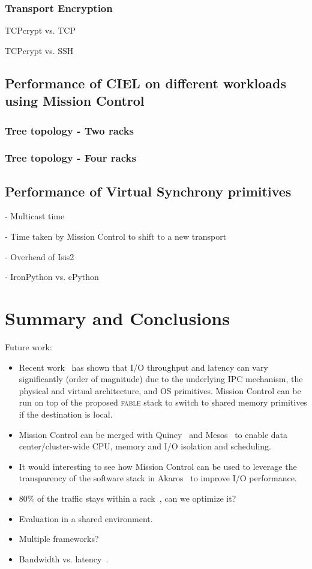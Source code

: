 \documentclass[a4paper,12pt,twoside,openright]{report}
\begin{document}
\subsection{Transport Encryption}
TCPcrypt vs. TCP

TCPcrypt vs. SSH

\section{Performance of CIEL on different workloads using Mission Control}

\subsection{Tree topology - Two racks}
\subsection{Tree topology - Four racks}

\section{Performance of Virtual Synchrony primitives}
- Multicast time

- Time taken by Mission Control to shift to a new transport

- Overhead of Isis2

- IronPython vs. cPython

\chapter{Summary and Conclusions}\label{chapter:conclusion}

Future work:

\begin{itemize}
  \item Recent work~\cite{Smith:2012:TCF} has shown that I/O throughput
	and latency can vary significantly (order of magnitude) due to the underlying
	IPC mechanism, the physical and virtual architecture, and OS primitives.
	Mission Control can be run on top of the proposed \textsc{fable} stack to
	switch to shared memory primitives if the destination is local.
   \item Mission Control can be merged with Quincy~\cite{Isard:2009:QFS} and
   Mesos~\cite{Hindman:2011:MPF} to enable data center/cluster-wide CPU, memory
   and I/O isolation and scheduling.
   \item It would interesting to see how Mission Control can be used to leverage
   the transparency of the software stack in Akaros~\cite{Rhoden:2011:IPE} to
   improve I/O performance.
   \item 80\% of the traffic stays within a rack~\cite{Benson:2010:NTC}, can we
optimize it?
	\item Evaluation in a shared environment.
	\item Multiple frameworks?
	\item Bandwidth vs. latency~\cite{Alizadeh:2012:LIM}.
\end{itemize}

\appendix
\singlespacing

 
 
\end{document}
